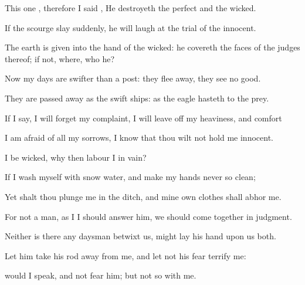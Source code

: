 {\par }{\PP {}This
{}
one
{}, therefore I
said
{}, He
destroyeth the
perfect and the
wicked.

If the
scourge
slay
suddenly, he will
laugh at the
trial of the
innocent.

The
earth is
given into the
hand of the
wicked: he
covereth the
faces of the
judges thereof; if not,
where,
{} who
{} he?


\par }{\PP {}Now my
days are
swifter than a
post: they flee
away, they
see no
good.

They are passed
away
as the
swift
ships: as the
eagle
{}
hasteth to the
prey.

If I
say, I will
forget my
complaint, I will leave
off my
heaviness, and
comfort
{}

I am
afraid of all my
sorrows, I
know that thou wilt not hold me
innocent.

 I be
wicked, why then
labour I in
vain?

If I
wash myself
with snow
water, and make my
hands
never so
clean;

Yet shalt thou
plunge me in the
ditch, and mine own
clothes shall
abhor me.

For
{} not a
man, as I
{} I should
answer him,
{} we should
come
together in
judgment.

Neither
is there any
daysman betwixt us,
{} might
lay his
hand upon us
both.

Let him
take his
rod
away from me, and let not his
fear
terrify me:

 would I
speak, and not
fear him; but
{} not so with me.




\par }
